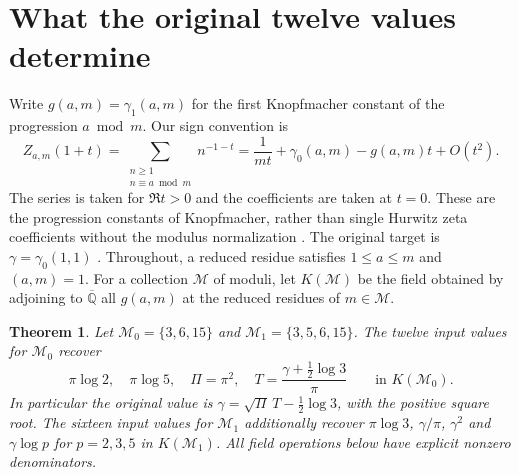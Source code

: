 \documentclass[11pt,a4paper,oneside,openany]{report}
\newtheorem{theorem}{Theorem}[section]
\theoremstyle{remark}\newtheorem{remark}[theorem]{Remark}
\numberwithin{equation}{section}
\newcommand{\A}{\overline{\mathbb Q}}\newcommand{\B}{\mathcal B}
\begin{document}
\section{What the original twelve values determine}
Write $g(a,m)=\gamma_1(a,m)$ for the first Knopfmacher constant of the progression $a\bmod m$. Our sign convention is
\[
 Z_{a,m}(1+t)=\sum_{\substack{n\ge1\\n\equiv a\bmod m}}n^{-1-t}
 =\frac1{mt}+\gamma_0(a,m)-g(a,m)t+O(t^2).
\]
The series is taken for $\Re t>0$ and the coefficients are taken at $t=0$. These are the progression constants of Knopfmacher, rather than single Hurwitz zeta coefficients without the modulus normalization \cite{knop,mp}. The original target is $\gamma=\gamma_0(1,1)$ \cite{lagarias}. Throughout, a reduced residue satisfies $1\le a\le m$ and $(a,m)=1$. For a collection $\mathcal M$ of moduli, let $K(\mathcal M)$ be the field obtained by adjoining to $\A$ all $g(a,m)$ at the reduced residues of $m\in\mathcal M$.

\begin{theorem}\label{ch7:t:reconstruct}
Let $\mathcal M_0=\{3,6,15\}$ and $\mathcal M_1=\{3,5,6,15\}$. The twelve input values for $\mathcal M_0$ recover
\[
 \pi\log 2,\quad \pi\log5,\quad \Pi=\pi^2,\quad
 T=\frac{\gamma+\tfrac12\log3}{\pi}
 \qquad\text{in } K(\mathcal M_0).
\]
In particular the original value is $\gamma=\sqrt\Pi\,T-\tfrac12\log3$, with the positive square root. The sixteen input values for $\mathcal M_1$ additionally recover $\pi\log3$, $\gamma/\pi$, $\gamma^2$ and $\gamma\log p$ for $p=2,3,5$ in $K(\mathcal M_1)$. All field operations below have explicit nonzero denominators.
\end{theorem}
\end{document}
